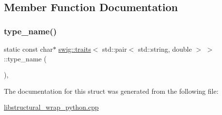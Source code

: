 \subsection{Member Function Documentation}
\mbox{\label{structswig_1_1traits_3_01std_1_1pair_3_01std_1_1string_00_01double_01_4_01_4_a677c97378120d1b3fc44aaffe50fd712}} 
\subsubsection{\texorpdfstring{type\+\_\+name()}{type\_name()}}
{\footnotesize\ttfamily static const char$\ast$ \hyperlink{structswig_1_1traits}{swig\+::traits}$<$ std\+::pair$<$ std\+::string, double $>$ $>$\+::type\+\_\+name (\begin{DoxyParamCaption}{ }\end{DoxyParamCaption})\hspace{0.3cm}{\ttfamily [inline]}, {\ttfamily [static]}}



The documentation for this struct was generated from the following file\+:\begin{DoxyCompactItemize}
\item 
\hyperlink{libstructural__wrap__python_8cpp}{libstructural\+\_\+wrap\+\_\+python.\+cpp}\end{DoxyCompactItemize}
